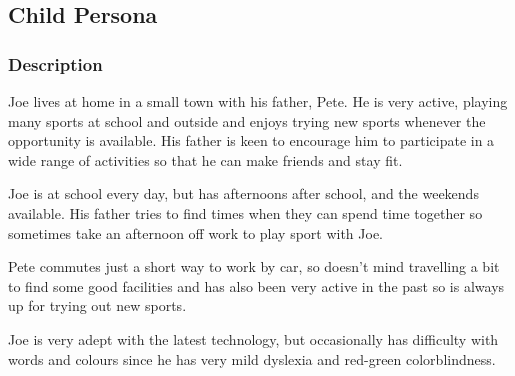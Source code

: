 \subsection{Child Persona}
\label{sub:child_persona}


\subsubsection*{Description}
\label{ssub:child_description}

Joe lives at home in a small town with his father, Pete. He is very active,
playing many sports at school and outside and enjoys trying new sports whenever
the opportunity is available. His father is keen to encourage him to
participate in a wide range of activities so that he can make friends and stay
fit.

Joe is at school every day, but has afternoons after school, and the weekends
available. His father tries to find times when they can spend time together so
sometimes take an afternoon off work to play sport with Joe.

Pete commutes just a short way to work by car, so doesn’t mind travelling a bit
to find some good facilities and has also been very active in the past so is
always up for trying out new sports.

Joe is very adept with the latest technology, but occasionally has difficulty
with words and colours since he has very mild dyslexia and red-green
colorblindness.

